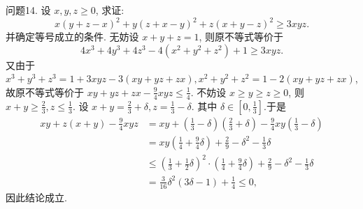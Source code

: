 问题14. 设 $x, y, z \geqslant 0$, 求证:
$$
x(y+z-x)^2+y(z+x-y)^2+z(x+y-z)^2 \geqslant 3 x y z .
$$
并确定等号成立的条件.
无妨设 $x+y+z=1$, 则原不等式等价于
$$
4 x^3+4 y^3+4 z^3-4\left(x^2+y^2+z^2\right)+1 \geqslant 3 x y z .
$$
又由于 $x^3+y^3+z^3=1+3 x y z-3(x y+y z+z x), x^2+y^2+z^2=1- 2(x y+y z+z x)$,故原不等式等价于 $x y+y z+z x-\frac{9}{4} x y z \leqslant \frac{1}{4}$.
不妨设 $x \geqslant y \geqslant z \geqslant 0$, 则 $x+y \geqslant \frac{2}{3}, z \leqslant \frac{1}{3}$. 设 $x+y=\frac{2}{3}+\delta, z= \frac{1}{3}-\delta$. 其中 $\delta \in\left[0, \frac{1}{3}\right]$.于是
$$
\begin{aligned}
x y+z(x+y)-\frac{9}{4} x y z & =x y+\left(\frac{1}{3}-\delta\right)\left(\frac{2}{3}+\delta\right)-\frac{9}{4} x y\left(\frac{1}{3}-\delta\right) \\
& =x y\left(\frac{1}{4}+\frac{9}{4} \delta\right)+\frac{2}{9}-\delta^2-\frac{1}{3} \delta \\
& \leqslant\left(\frac{1}{3}+\frac{1}{2} \delta\right)^2 \cdot\left(\frac{1}{4}+\frac{9}{4} \delta\right)+\frac{2}{9}-\delta^2-\frac{1}{3} \delta \\
& =\frac{3}{16} \delta^2(3 \delta-1)+\frac{1}{4} \leqslant 0,
\end{aligned}
$$
因此结论成立.



